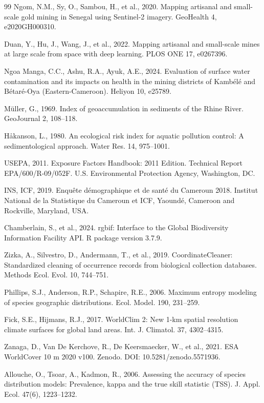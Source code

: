 \documentclass[preprint,12pt,number]{elsarticle}
\begin{document}
\begin{thebibliography}{99}
Ngom, N.M., Sy, O., Sambou, H., et al., 2020. Mapping artisanal and small-scale gold mining in Senegal using Sentinel-2 imagery. GeoHealth 4, e2020GH000310.

Duan, Y., Hu, J., Wang, J., et al., 2022. Mapping artisanal and small-scale mines at large scale from space with deep learning. PLOS ONE 17, e0267396.

Ngoa Manga, C.C., Ashu, R.A., Ayuk, A.E., 2024. Evaluation of surface water contamination and its impacts on health in the mining districts of Kamb\'{e}l\'{e} and B\'{e}tar\'{e}-Oya (Eastern-Cameroon). Heliyon 10, e25789.

M\"{u}ller, G., 1969. Index of geoaccumulation in sediments of the Rhine River. GeoJournal 2, 108--118.

H\r{a}kanson, L., 1980. An ecological risk index for aquatic pollution control: A sedimentological approach. Water Res. 14, 975--1001.

USEPA, 2011. Exposure Factors Handbook: 2011 Edition. Technical Report EPA/600/R-09/052F. U.S. Environmental Protection Agency, Washington, DC.

INS, ICF, 2019. Enqu\^{e}te d\'{e}mographique et de sant\'{e} du Cameroun 2018. Institut National de la Statistique du Cameroun et ICF, Yaound\'{e}, Cameroon and Rockville, Maryland, USA.

Chamberlain, S., et al., 2024. rgbif: Interface to the Global Biodiversity Information Facility API. R package version 3.7.9.

Zizka, A., Silvestro, D., Andermann, T., et al., 2019. CoordinateCleaner: Standardized cleaning of occurrence records from biological collection databases. Methods Ecol. Evol. 10, 744--751.

Phillips, S.J., Anderson, R.P., Schapire, R.E., 2006. Maximum entropy modeling of species geographic distributions. Ecol. Model. 190, 231--259.

Fick, S.E., Hijmans, R.J., 2017. WorldClim 2: New 1-km spatial resolution climate surfaces for global land areas. Int. J. Climatol. 37, 4302--4315.

Zanaga, D., Van De Kerchove, R., De Keersmaecker, W., et al., 2021. ESA WorldCover 10 m 2020 v100. Zenodo. DOI: 10.5281/zenodo.5571936.

Allouche, O., Tsoar, A., Kadmon, R., 2006. Assessing the accuracy of species distribution models: Prevalence, kappa and the true skill statistic (TSS). J. Appl. Ecol. 47(6), 1223--1232.


\end{thebibliography}
\end{document}
